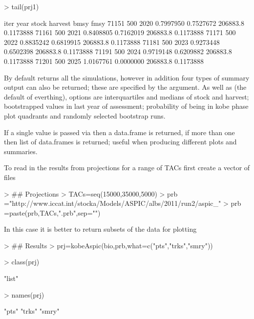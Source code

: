 \documentclass[shortnames,nojss,article]{jss}
\begin{document}
\begin{Schunk}
\begin{Sinput}
> tail(prj1)
\end{Sinput}
\begin{Soutput}
      iter year     stock   harvest     bmsy      fmsy
71151  500 2020 0.7997950 0.7527672 206883.8 0.1173888
71161  500 2021 0.8408805 0.7162019 206883.8 0.1173888
71171  500 2022 0.8835242 0.6819915 206883.8 0.1173888
71181  500 2023 0.9273448 0.6502398 206883.8 0.1173888
71191  500 2024 0.9719148 0.6209882 206883.8 0.1173888
71201  500 2025 1.0167761 0.0000000 206883.8 0.1173888
\end{Soutput}
\end{Schunk}

By default  returns all the simulations, however in addition four types of summary output can also be returned;  
these are specified by the  argument. As well as  (the default of everthing), options are 
 interquartiles and medians of stock and harvest;
  bootstrapped values in last year of assessment;
 probability of being in kobe phase plot quadrants and
 randomly selected bootstrap runs.

If a single value is passed via  then a data.frame is returned, if more than one then list of data.frames is returned; useful 
when producing different plots and summaries.  

To read in the results from projections for a range of TACs first create a vector of files 
\begin{Schunk}
\begin{Sinput}
> ## Projections
> TACs=seq(15000,35000,5000)
> prb ="http://www.iccat.int/stocka/Models/ASPIC/albs/2011/run2/aspic_"
> prb =paste(prb,TACs,".prb",sep="")
\end{Sinput}
\end{Schunk}

In this case it is better to return subsets of the data for plotting
\begin{Schunk}
\begin{Sinput}
> ## Results
> prj=kobeAspic(bio,prb,what=c("pts","trks","smry"))
\end{Sinput}
\end{Schunk}

\begin{Schunk}
\begin{Sinput}
> class(prj)
\end{Sinput}
\begin{Soutput}
[1] "list"
\end{Soutput}
\begin{Sinput}
> names(prj)
\end{Sinput}
\begin{Soutput}
[1] "pts"  "trks" "smry"
\end{Soutput}
\end{Schunk}
\end{document}
